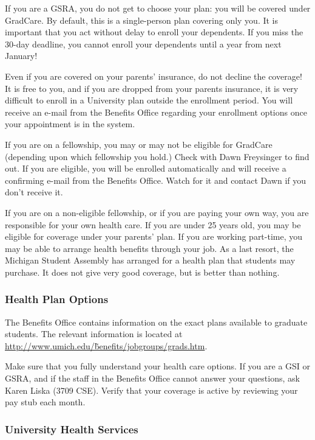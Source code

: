\documentclass[11pt]{article}
\begin{document}
If you are a GSRA, you do not get to choose your plan:  you will be
covered under GradCare.  By default, this is a single-person plan
covering only you.  It is important that you act without delay to
enroll your dependents.  If you miss the 30-day deadline, you cannot
enroll your dependents until a year from next January!

Even if you are covered on your parents’ insurance, do not decline the
coverage!  It is free to you, and if you are dropped from your parents
insurance, it is very difficult to enroll in a University plan outside
the enrollment period.  You will receive an e-mail from the Benefits
Office regarding your enrollment options once your appointment is in
the system.

If you are on a fellowship, you may or may not be eligible for
GradCare (depending upon which fellowship you hold.)  Check with Dawn
Freysinger to find out.  If you are eligible, you will be enrolled
automatically and will receive a confirming e-mail from the Benefits
Office.  Watch for it and contact Dawn if you don’t receive it.

If you are on a non-eligible fellowship, or if you are paying your own
way, you are responsible for your own health care.  If you are under
25 years old, you may be eligible for coverage under your parents'
plan.  If you are working part-time, you may be able to arrange health
benefits through your job.  As a last resort, the Michigan Student
Assembly has arranged for a health plan that students may purchase.
It does not give very good coverage, but is better than nothing.
\subsubsection{Health Plan Options}
\label{sec-4_3_1}

The Benefits Office contains information on the exact plans available
to graduate students.  The relevant information is located at
\href{http://www.umich.edu/~benefits/jobgroups/grads.htm}{http://www.umich.edu/\~benefits/jobgroups/grads.htm}.

Make sure that you fully understand your health care options.  If you
are a GSI or GSRA, and if the staff in the Benefits Office cannot
answer your questions, ask Karen Liska (3709 CSE).  Verify that your
coverage is active by reviewing your pay stub each month.
\subsubsection{University Health Services}
\label{sec-4_3_2}
\end{document}
